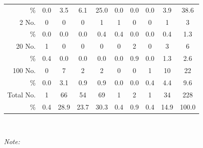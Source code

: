 \documentclass[11pt,a4paper]{article}
\newcommand{\fns}{\footnotesize}
\begin{document}
\begin{refsection}
\begin{table}[htbp]
\begin{tabular}[h]{rccccccccc}
\%             & \fns \color{gray} 0.0 & \fns 3.5              & \fns 6.1              & \fns 25.0             & \fns \color{gray} 0.0 & \fns \color{gray} 0.0 & \fns \color{gray} 0.0 & \fns 3.9              & \fns 38.6 \\
2 No.          & \color{gray} 0        & \color{gray} 0        & \color{gray} 0        & 1                     & 1                     & \color{gray} 0        & \color{gray} 0        & 1                     & 3         \\
\%             & \fns \color{gray} 0.0 & \fns \color{gray} 0.0 & \fns \color{gray} 0.0 & \fns 0.4              & \fns 0.4              & \fns \color{gray} 0.0 & \fns \color{gray} 0.0 & \fns 0.4              & \fns 1.3  \\
20 No.         & 1                     & \color{gray} 0        & \color{gray} 0        & \color{gray} 0        & \color{gray} 0        & 2                     & \color{gray} 0        & 3                     & 6         \\
\%             & \fns 0.4              & \fns \color{gray} 0.0 & \fns \color{gray} 0.0 & \fns \color{gray} 0.0 & \fns \color{gray} 0.0 & \fns 0.9              & \fns \color{gray} 0.0 & \fns 1.3              & \fns 2.6  \\
100 No.        & \color{gray} 0        & 7                     & 2                     & 2                     & \color{gray} 0        & \color{gray} 0        & 1                     & 10                    & 22        \\
\%             & \fns \color{gray} 0.0 & \fns 3.1              & \fns 0.9              & \fns 0.9              & \fns \color{gray} 0.0 & \fns \color{gray} 0.0 & \fns 0.4              & \fns 4.4              & \fns 9.6  \\
    \midrule
Total No.      & 1                     & 66                    & 54                    & 69                    & 1                     & 2                     & 1                     & 34                    & 228       \\
\%             & 0.4                   & 28.9                  & 23.7                  & 30.3                  & 0.4                   & 0.9                   & 0.4                   & 14.9                  & 100.0     \\
 \bottomrule 
  \end{tabular}
  \label{ap:tab:sdifftype}
  \smallskip  \\
  \parbox{\linewidth}{\footnotesize\textit{Note:}  }
\end{table}


\end{refsection}
\end{document}
